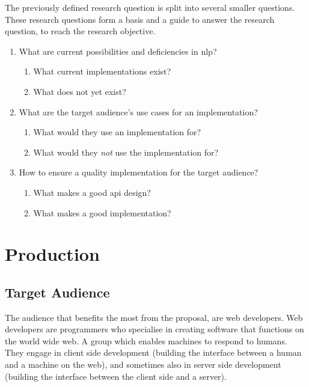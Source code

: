 The previously defined research question is split into several smaller
  questions.
These research questions form a basis and a guide to answer the research
  question, to reach the research objective.

\begin{enumerate}
\item
  What are current possibilities and deficiencies in \gls{nlp}?
  \begin{enumerate}
    \item What current implementations exist?
    \item What does not yet exist?
  \end{enumerate}
\item
  What are the target audience's use cases for an implementation?
  \begin{enumerate}
    \item What would they use an implementation for?
    \item What would they \emph{not} use the implementation for?
  \end{enumerate}
\item
  How to ensure a quality implementation for the target audience?
  \begin{enumerate}
    \item What makes a good \gls{api} design?
    \item What makes a good implementation?
  \end{enumerate}
\end{enumerate}

\chapter{Production}\label{production}

\section{Target Audience}\label{target-audience}

The audience that benefits the most from the proposal, are web developers.
Web developers are programmers who specialise in creating software that
  functions on the world wide web.
A group which enables machines to respond to humans.
They engage in client side development (building the interface between
  a human and a machine on the web), and sometimes also in server side
  development (building the interface between the client side and a
  server).


